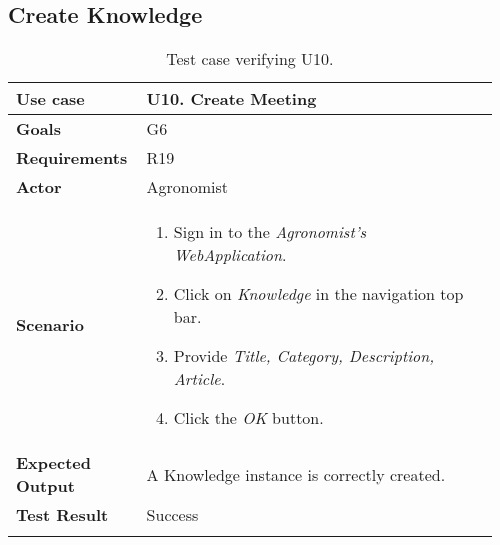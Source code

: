 \subsection{Create Knowledge}
\begin{longtable}{@{}p{0.25\linewidth}p{0.71\linewidth}@{}}
	\toprule
	\textbf{Use case} & \textbf{U10.} Create Meeting\\
	\midrule
	\textbf{Goals} & G6\\
	\midrule
	\textbf{Requirements} & R19\\
	\midrule
	\textbf{Actor} & Agronomist\\
	\midrule
	\textbf{Scenario} &
	\begin{enumerate}[leftmargin=.4cm,noitemsep,topsep=0pt,before=\vspace{-3mm},after=\vspace{-4mm}]
		\item Sign in to the \textit{Agronomist's WebApplication}.
		\item Click on \textit{Knowledge} in the navigation top bar.
		\item Provide \textit{Title, Category, Description, Article}.
		\item Click the \textit{OK} button.
 	\end{enumerate}\\
	\midrule
	\textbf{Expected Output} & A Knowledge instance is correctly created.\\
	\midrule
	\textbf{Test Result} & Success\\
	\bottomrule
    \caption{Test case verifying U10.}
\end{longtable}


